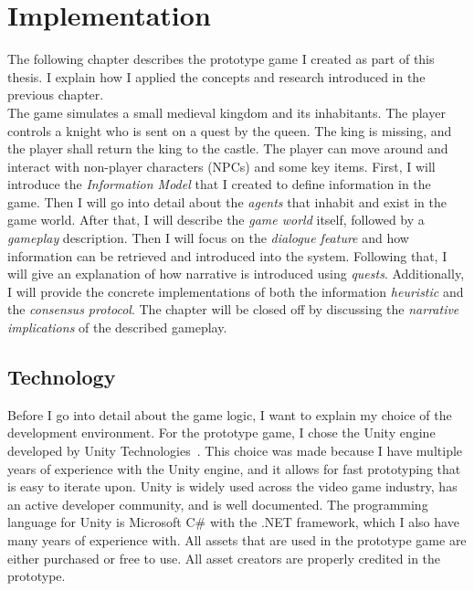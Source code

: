 \chapter{Implementation}
The following chapter describes the prototype game I created as part of this thesis. I explain how I applied the concepts and research introduced in the previous chapter.\\
The game simulates a small medieval kingdom and its inhabitants. The player controls a knight who is sent on a quest by the queen. The king is missing, and the player shall return the king to the castle. The player can move around and interact with non-player characters (NPCs) and some key items. First, I will introduce the \textit{Information Model} that I created to define information in the game. Then I will go into detail about the \textit{agents} that inhabit and exist in the game world. After that, I will describe the \textit{game world} itself, followed by a \textit{gameplay} description. Then I will focus on the \textit{dialogue feature} and how information can be retrieved and introduced into the system. Following that, I will give an explanation of how narrative is introduced using \textit{quests}. Additionally, I will provide the concrete implementations of both the information \textit{heuristic} and the \textit{consensus protocol}. The chapter will be closed off by discussing the \textit{narrative implications} of the described gameplay.
\section{Technology}
Before I go into detail about the game logic, I want to explain my choice of the development environment. For the prototype game, I chose the Unity engine developed by Unity Technologies~\cite{Unity2021}. This choice was made because I have multiple years of experience with the Unity engine, and it allows for fast prototyping that is easy to iterate upon. Unity is widely used across the video game industry, has an active developer community, and is well documented. The programming language for Unity is Microsoft C\# with the .NET framework, which I also have many years of experience with. All assets that are used in the prototype game are either purchased or free to use. All asset creators are properly credited in the prototype.
